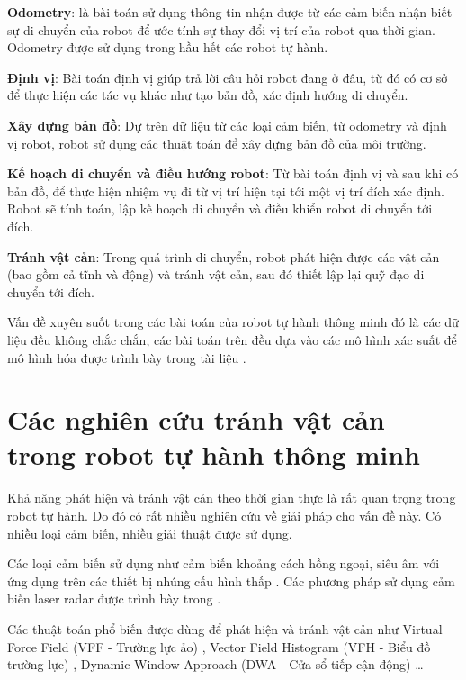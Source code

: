 \textbf{Odometry}: là bài toán sử dụng thông tin nhận được từ các cảm biến nhận biết sự di chuyển của robot để ước tính sự thay đổi vị trí của robot qua thời gian. Odometry được sử dụng trong hầu hết các robot tự hành.

\textbf{Định vị}: Bài toán định vị giúp trả lời câu hỏi robot đang ở đâu, từ đó có cơ sở để thực hiện các tác vụ khác như tạo bản đồ, xác định hướng di chuyển.

\textbf{Xây dựng bản đồ}: Dự trên dữ liệu từ các loại cảm biến, từ odometry và định vị robot, robot sử dụng các thuật toán để xây dựng bản đồ của môi trường.

\textbf{Kế hoạch di chuyển và điều hướng robot}: Từ bài toán định vị và sau khi có bản đồ, để thực hiện nhiệm vụ đi từ vị trí hiện tại tới một vị trí đích xác định. Robot sẽ tính toán, lập kế hoạch di chuyển và điều khiển robot di chuyển tới đích.

\textbf{Tránh vật cản}: Trong quá trình di chuyển, robot phát hiện được các vật cản (bao gồm cả tĩnh và động) và tránh vật cản, sau đó thiết lập lại quỹ đạo di chuyển tới đích.

Vấn đề xuyên suốt trong các bài toán của robot tự hành thông minh đó là các dữ liệu đều không chắc chắn, các bài toán trên đều dựa vào các mô hình xác suất để mô hình hóa được trình bày trong tài liệu \cite{thrun2005probabilistic}.


\section{Các nghiên cứu tránh vật cản trong robot tự hành thông minh}
\label{sec:tranhVatCan_ref}

Khả năng phát hiện và tránh vật cản theo thời gian thực là rất quan trọng trong robot tự hành. Do đó có rất nhiều nghiên cứu về giải pháp cho vấn đề này. Có nhiều loại cảm biến, nhiều giải thuật được sử dụng.

Các loại cảm biến sử dụng như cảm biến khoảng cách hồng ngoại, siêu âm với ứng dụng trên các thiết bị nhúng cấu hình thấp \cite{dongyue2013, Susnea2009}. Các phương pháp sử dụng cảm biến laser radar được trình bày trong \cite{Gao2019, Wu2015, Peng2015,Baras2019}.

Các thuật toán phổ biến được dùng để phát hiện và tránh vật cản như Virtual Force Field (VFF - Trường lực ảo) \cite{Borenstein1989}, Vector Field Histogram (VFH - Biểu đồ trường lực) \cite{Borenstein1991}, Dynamic Window Approach (DWA - Cửa sổ tiếp cận động) \cite{Fox1997}\ldots

